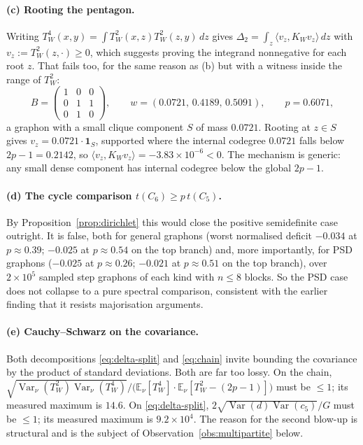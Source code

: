 \documentclass[11pt]{article}
\theoremstyle{definition}
\newcommand{\E}{\mathbb E}
\newcommand{\Var}{\operatorname{Var}}
\newcommand{\tw}{T_W}
\newcommand{\kw}{K_W}
\begin{document}
\paragraph{(c) Rooting the pentagon.}
Writing $\tw^4(x,y)=\int\tw^2(x,z)\tw^2(z,y)\,dz$ gives
$\Delta_2=\int_z\langle v_z,\kw v_z\rangle\,dz$ with $v_z:=\tw^2(z,\cdot)\ge0$,
which suggests proving the integrand nonnegative for each root $z$.  That fails
too, for the same reason as (b) but with a witness inside the range of $\tw^2$:
\[
  B=\begin{pmatrix}1&0&0\\0&1&1\\0&1&0\end{pmatrix},\qquad
  w=(0.0721,\,0.4189,\,0.5091),\qquad p=0.6071,
\]
a graphon with a small clique component $S$ of mass $0.0721$.  Rooting at
$z\in S$ gives $v_z=0.0721\cdot\mathbf 1_S$, supported where the internal
codegree $0.0721$ falls below $2p-1=0.2142$, so
$\langle v_z,\kw v_z\rangle=-3.83\times10^{-6}<0$.  The mechanism is generic:
any small dense component has internal codegree below the global $2p-1$.

\paragraph{(d) The cycle comparison $t(C_6)\ge p\,t(C_5)$.}
By Proposition~\ref{prop:dirichlet} this would close the positive semidefinite
case outright.  It is false, both for general graphons (worst normalised deficit
$-0.034$ at $p\approx0.39$; $-0.025$ at $p\approx0.54$ on the top branch) and,
more importantly, for PSD graphons ($-0.025$ at $p\approx0.26$; $-0.021$ at
$p\approx0.51$ on the top branch), over $2\times10^5$ sampled step graphons of
each kind with $n\le8$ blocks.  So the PSD case does not collapse to a pure
spectral comparison, consistent with the earlier finding that it resists
majorisation arguments.

\paragraph{(e) Cauchy--Schwarz on the covariance.}  Both decompositions
\eqref{eq:delta-split} and \eqref{eq:chain} invite bounding the covariance by
the product of standard deviations.  Both are far too lossy.  On the chain,
$\sqrt{\Var_\nu(\tw^2)\Var_\nu(\tw^4)}\big/\big(\E_\nu[\tw^4]\cdot
\E_\nu[\tw^2-(2p-1)]\big)$ must be $\le1$; its measured maximum is $14.6$.  On
\eqref{eq:delta-split}, $2\sqrt{\Var(d)\Var(c_5)}/G$ must be $\le1$; its
measured maximum is $9.2\times10^{4}$.  The reason for the second blow-up is
structural and is the subject of Observation~\ref{obs:multipartite} below.
\end{document}

